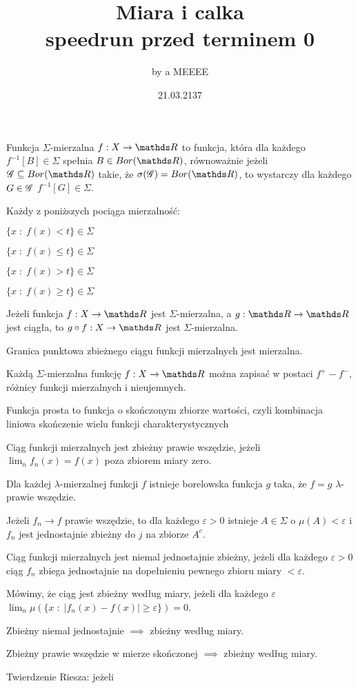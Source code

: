 \documentclass{article}[13pt]
\title{Miara i calka\medskip\\{\normalsize speedrun przed terminem 0}}
\author{by a MEEEE}
\date {21.03.2137}
\newcommand{\bor}{Bor(\R)}
\begin{document}
\maketitle

\begin{multicols*}{2}
    {\color{def}Funkcja $\Sigma$-mierzalna} $f:X\to\R$ to funkcja, która dla każdego $f^{-1}[B]\in\Sigma$ spełnia $B\in\bor$, równoważnie jeżeli $\rodz{G}\subseteq\bor$ takie, że $\sigma(\rodz{G})=\bor$, to wystarczy dla każdego $G\in\mathcal{G}$ $f^{-1}[G]\in\Sigma$.
    \medskip

    Każdy z poniższych pociąga mierzalność:
    \smallskip

    $\{x\;:\;f(x)<t\}\in\Sigma$

    $\{x\;:\;f(x)\leq t\}\in\Sigma$

    $\{x\;:\;f(x)>t\}\in\Sigma$

    $\{x\;:\;f(x)\geq t\}\in \Sigma$
    \medskip

    Jeżeli funkcja $f:X\to\R$ jest $\Sigma$-mierzalna, a $g:\R\to\R$ jest ciągła, to $g\circ f:X\to\R$ jest $\Sigma$-mierzalna.
    \medskip

    {\color{acc}Granica punktowa} zbieżnego ciągu funkcji mierzalnych jest mierzalna.
    \medskip

    Każdą $\Sigma$-mierzalna funkcję $f:X\to\R$ można zapisać w postaci $f^+-f^-$, różnicy funkcji mierzalnych i nieujemnych.
    \medskip

    \medskip

    {\color{def}Funkcja prosta} to funkcja o skończonym zbiorze wartości, czyli kombinacja liniowa skończenie wielu {\color{acc}funkcji charakterystycznych}
    \medskip

    Ciąg funkcji mierzalnych jest {\color{def}zbieżny prawie wszędzie}, jeżeli $\lim_nf_n(x)=f(x)$ poza zbiorem miary zero.
    \medskip

    Dla każdej $\lambda$-mierzalnej funkcji $f$ istnieje borelowska funkcja $g$ taka, że $f=g$ $\lambda$-prawie wszędzie.
    \medskip

    Jeżeli $f_n\to f$ prawie wszędzie, to dla każdego $\varepsilon>0$ istnieje $A\in\Sigma$ o $\mu(A)<\varepsilon$ i $f_n$ jest jednostajnie zbieżny do $j$ na zbiorze $A^c$.
    \medskip

    Ciąg funkcji mierzalnych jest {\color{def}niemal jednostajnie zbieżny}, jeżeli dla każdego $\varepsilon>0$ ciąg $f_n$ zbiega jednostajnie na dopełnieniu pewnego zbioru miary $<\varepsilon$.
    \medskip

    Mówimy, że ciąg jest {\color{def}zbieżny według miary}, jeżeli dla każdego $\varepsilon$ $\lim_n\mu(\{x\;:\;|f_n(x)-f(x)|\geq\varepsilon\})=0$.
    \medskip

    {\color{acc}\point} Zbieżny niemal jednostajnie $\implies$ zbieżny według miary.

    {\color{acc}\point} Zbieżny prawie wszędzie w mierze skończonej $\implies$ zbieżny według miary.
    \medskip

    {\color{def}Twierdzenie Riesza}: jeżeli 
\end{multicols*}
\end{document}
